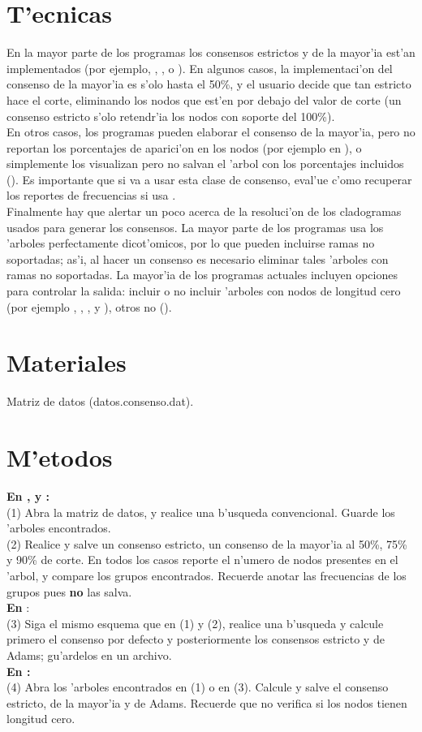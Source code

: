 \section{T'ecnicas}
En la mayor parte de los programas los consensos estrictos y de la mayor'ia est'an implementados (por ejemplo, , ,  o ). En algunos casos, la implementaci'on del consenso de la mayor'ia es s'olo hasta el 50\%, y el usuario decide que tan estricto hace el corte, eliminando los nodos que est'en por debajo del valor de corte (un consenso estricto s'olo retendr'ia los nodos con soporte del 100\%).\\
En otros casos, los programas pueden elaborar el consenso de la mayor'ia, pero no reportan los porcentajes de aparici'on en los nodos (por ejemplo en ), o simplemente los visualizan pero no salvan el 'arbol con los porcentajes incluidos (). Es importante que si va a usar esta clase de consenso, eval'ue c'omo recuperar los reportes de frecuencias si usa .\\
Finalmente hay que alertar un poco acerca de la resoluci'on de los cladogramas usados para generar los consensos. La mayor parte de los programas usa los 'arboles perfectamente dicot'omicos, por lo que pueden incluirse ramas no soportadas; as'i, al hacer un consenso es necesario eliminar tales 'arboles con ramas no soportadas. La mayor'ia de los programas actuales incluyen opciones para controlar la salida: incluir o no incluir 'arboles con nodos de longitud cero (por ejemplo , , ,  y ), otros no ().
\section{Materiales}
\noindent
Matriz de datos (datos.consenso.dat).
\section{M'etodos}
\noindent
\textbf{En ,  y :} \\
(1) Abra la matriz de datos, y realice una b'usqueda convencional. Guarde los 'arboles encontrados.\\
(2) Realice y salve un consenso estricto, un consenso de la mayor'ia al 50\%, 75\% y 90\% de corte. En todos los casos reporte el n'umero de nodos presentes en el 'arbol, y compare los grupos encontrados. Recuerde anotar las frecuencias de los grupos pues  \textbf{no} las salva.\\
\textbf{En }:\\
(3) Siga el mismo esquema que en (1) y (2), realice una b'usqueda y calcule primero el consenso por defecto y posteriormente los consensos estricto y de Adams; gu'ardelos en un archivo.\\
\textbf{En :}\\
(4) Abra los 'arboles encontrados en (1) o en (3). Calcule y salve el consenso estricto, de la mayor'ia y de Adams. Recuerde que  no verifica si los nodos tienen longitud cero.
